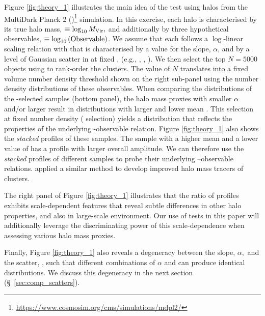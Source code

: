 \documentclass[fleqn,usenatbib,useAMS]{mnras}
\begin{document}
\begin{CJK*}{UTF8}{gbsn}
    Figure \ref{fig:theory_1} illustrates the main idea of the \topn{} test using halos from the
    MultiDark Planck 2 ()\footnote{\url{https://www.cosmosim.org/cms/simulations/mdpl2/}} 
    simulation. 
    In this exercise, each halo is characterised by its true halo mass, \haloSym{}$\equiv
    \log_{10}M_{\rm Vir},$ and additionally by three hypothetical observables, \obsSym{}$\equiv
    \log_{10}{(\rm Observable)}$.
    We assume that each \obsSym{} follows a $\log$-linear scaling relation with \mvir{} that is
    characterised by a value for the slope, $\alpha$, and by a level of Gaussian scatter in
    \obsSym{} at fixed \haloSym{}, \scatterObsSymMhalo{} (e.g., \citealt{Lieu2016},
    \citealt{Ziparo2016}, \citealt{Evrard2014, Farahi2018}).
    We then select the top $N=5000$ objects using \obsSym{} to rank-order the clusters.
    The value of $N$ translates into a fixed volume number density threshold shown on the
    right sub-panel using the number density distributions of these observables.
    When comparing the \mvir{} distributions of the \topn{}-selected samples (bottom panel), the
    halo mass proxies with smaller $\alpha$ and/or larger \scatterObsSymMhalo{} result in \mvir{}
    distributions with larger \scatterMhaloObsSym{} and lower mean \mvir{}.
    This selection at fixed number density (\topn{} selection) yields a \mvir{} distribution that
    reflects the properties of the underlying \mvir{}-observable relation.
    Figure \ref{fig:theory_1} also shows the \emph{stacked} \dsigma{} profiles of these \topn{}
    samples.
    The \topn{} sample with a higher mean \mvir{} and a lower value of \scatterMhaloObsSym{} has a 
    \dsigma{} profile with larger overall amplitude.
    We can therefore use the \emph{stacked} \dsigma{} profiles of different \topn{} samples to probe
    their underlying \mvir{}--observable relations. 
    \citet[][]{Reyes2008} applied a similar method to develop improved halo mass tracers of
    clusters.
    
    The right panel of Figure \ref{fig:theory_1} illustrates that the ratio of \dsigma{} profiles
    exhibits scale-dependent features that reveal subtle differences in other halo properties, and
    also in large-scale environment. 
    Our use of \topn{} tests in this paper will additionally leverage the discriminating power of
    this scale-dependence when assessing various halo mass proxies.

    Finally, Figure \ref{fig:theory_1} also reveals a degeneracy between the slope, $\alpha,$ and
    the scatter, \scatterObsSymMhalo{}, such that different combinations of $\alpha$ and
    \scatterObsSymMhalo{} can produce identical \mvir{} distributions.
    We discuss this degeneracy in the next section (\S\ \ref{sec:comp_scatters}).


\end{CJK*}
\end{document}
